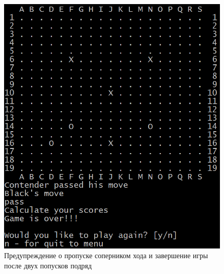 \begin{figure}[H]
	\begin{center}
		\includegraphics[scale=0.6]{pics/GoCUI/Pass.png}
	    \caption{Предупреждение о пропуске соперником хода и завершение игры после двух попусков подряд} 
		\label{pic:CUI_Pass}
	\end{center}
\end{figure}

